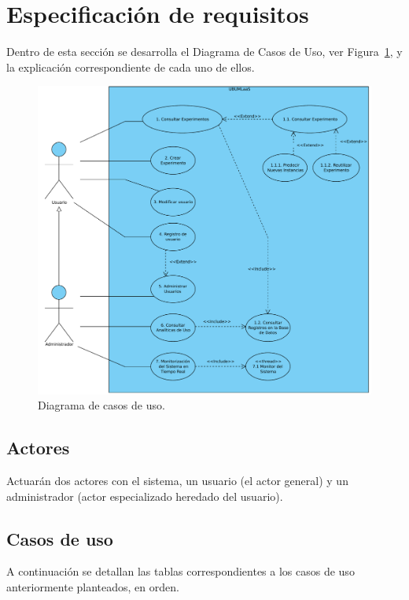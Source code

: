 \section{Especificación de requisitos}

Dentro de esta sección se desarrolla el Diagrama de Casos de Uso, ver Figura~\ref{img:diagrama-casos-uso}, y la explicación correspondiente de cada uno de ellos.

\begin{figure}[h!]
	\centering
	\includegraphics[scale=0.5]{../img/anexos/requisitos/Casos-de-uso}
	\caption{Diagrama de casos de uso.}\label{img:diagrama-casos-uso}
\end{figure}

\subsection{Actores}
Actuarán dos actores con el sistema, un usuario (el actor general) y un administrador (actor especializado heredado del usuario).

\subsection{Casos de uso}\label{casos-de-uso}
A continuación se detallan las tablas correspondientes a los casos de uso anteriormente planteados, en orden.

